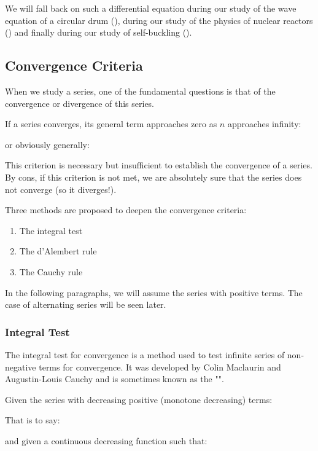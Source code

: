 	We will fall back on such a differential equation during our study of the wave equation of a circular drum (), during our study of the physics of nuclear reactors () and finally during our study of self-buckling ().
	
	\subsection{Convergence Criteria}
	When we study a series, one of the fundamental questions is that of the convergence or divergence of this series.
	
	If a series converges, its general term approaches zero as $n$ approaches infinity:
	
	or obviously generally:
	
	This criterion is necessary but insufficient to establish the convergence of a series. By cons, if this criterion is not met, we are absolutely sure that the series does not converge (so it diverges!).
	
	Three methods are proposed to deepen the convergence criteria:
	\begin{enumerate}
		\item The integral test

		\item The d'Alembert rule

		\item The Cauchy rule
	\end{enumerate}
	In the following paragraphs, we will assume the series with positive terms. The case of alternating series will be seen later.
	
	\subsubsection{Integral Test}
	The integral test for convergence is a method used to test infinite series of non-negative terms for convergence. It was developed by Colin Maclaurin and Augustin-Louis Cauchy and is sometimes known as the "".
	
	Given the series with decreasing positive (monotone decreasing) terms:
	
	That is to say:
	
	and given a continuous decreasing function such that:
	
